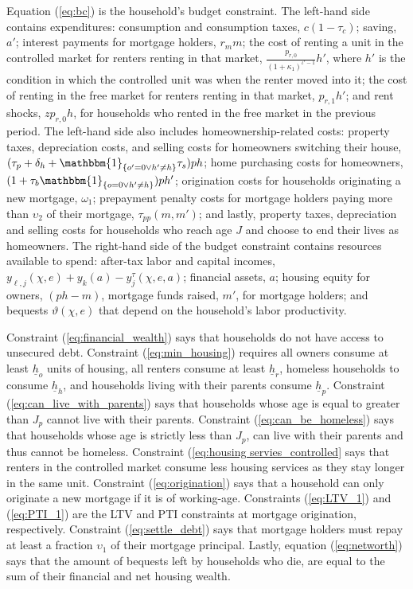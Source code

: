 \documentclass[parskip=full]{article}
\newcommand{\indicator}[1]{\mathbbm{1}_{\left\{ {#1} \right\} }}
\begin{document}
Equation (\ref{eq:bc}) is the household's budget constraint. The left-hand side contains expenditures: consumption and consumption taxes, $c(1-\tau_{c})$; saving, $a'$; interest payments for mortgage holders, $r_{m}m$; the cost of renting a unit in the controlled market for renters renting in that market, $\frac{p_{r,0}}{(1+\kappa_{1})^{\iota'-1}}h'$, where $h'$ is the condition in which the controlled unit was when the renter moved into it; the cost of renting in the free market for renters renting in that market, $p_{r,1}h'$; and rent shocks, $z p_{r,0}h$, for households who rented in the free market in the previous period. The left-hand side also includes homeownership-related costs: property taxes, depreciation costs, and selling costs for homeowners switching their house, $(\tau_{p}+\delta_{h}+\indicator{o'=0\vee h'\neq h}\tau_{s})ph$; home purchasing costs for homeowners, $(1+\tau_{b}\indicator{o=0\vee h'\neq h})ph'$; origination costs for households originating a new mortgage, $\omega_{1}$; prepayment penalty costs for mortgage holders paying more than $\upsilon_{2}$ of their mortgage, $\tau_{pp}(m,m')$; and lastly, property taxes, depreciation and selling costs for households who reach age $J$ and choose to end their lives as homeowners. The right-hand side of the budget constraint contains resources available to spend: after-tax labor and capital incomes, $y_{\ell,j}(\chi,e)+y_{k}(a)-y^{\tau}_{j}(\chi,e,a)$; financial assets, $a$; housing equity for owners, $(ph-m)$, mortgage funds raised, $m'$, for mortgage holders; and bequests $\vartheta(\chi,e)$ that depend on the household's labor productivity.

Constraint (\ref{eq:financial_wealth}) says that households do not have access to unsecured debt. Constraint (\ref{eq:min_housing}) requires all owners consume at least $\underline{h}_{o}$ units of housing, all renters consume at least $\underline{h}_{r}$, homeless households to consume $\underline{h}_{h}$, and households living with their parents consume $\underline{h}_{p}$. Constraint (\ref{eq:can_live_with_parents}) says that households whose age is equal to greater than $J_{p}$ cannot live with their parents. Constraint (\ref{eq:can_be_homeless}) says that households whose age is strictly less than $J_{p}$, can live with their parents and thus cannot be homeless. Constraint (\ref{eq:housing servies_controlled} says that renters in the controlled market consume less housing services as they stay longer in the same unit. Constraint (\ref{eq:origination}) says that a household can only originate a new mortgage if it is of working-age. Constraints (\ref{eq:LTV_1}) and (\ref{eq:PTI_1}) are the LTV and PTI constraints at mortgage origination, respectively. Constraint (\ref{eq:settle_debt}) says that mortgage holders must repay at least a fraction $\upsilon_{1}$ of their mortgage principal. Lastly, equation (\ref{eq:networth}) says that the amount of bequests left by households who die, are equal to the sum of their financial and net housing wealth.
\end{document}
